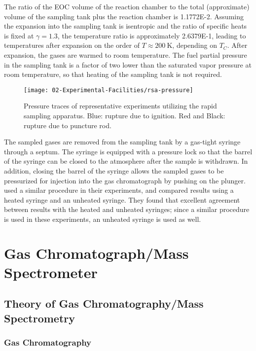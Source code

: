 \documentclass[../main.tex]{subfiles}
\begin{document}
The ratio of the EOC volume of the
reaction chamber to the total (approximate) volume of the sampling tank
plus the reaction chamber is \num{1.1772E-2}. Assuming the expansion
into the sampling tank is isentropic and the ratio of specific heats is
fixed at $\gamma=1.3$, the temperature ratio is approximately
\num{2.6379E-1}, leading to temperatures after expansion on the order of
$T\approx\SI{200}{\kelvin}$, depending on $T_C$. After expansion, the
gases are warmed to room temperature. The fuel partial pressure in the
sampling tank is a factor of two lower than the saturated vapor pressure
at room temperature, so that heating of the sampling tank is not required.

\begin{figure}
\texttt{[image: 02-Experimental-Facilities/rsa-pressure]}
\caption{Pressure traces of representative experiments utilizing the
rapid sampling apparatus. Blue: rupture due to ignition. Red and Black:
rupture due to puncture rod.}
\label{fig:rsa-pressure}
\end{figure}

The sampled gases are removed from the sampling tank by a gas-tight
syringe through a septum. The syringe is equipped with a pressure lock
so that the barrel of the syringe can be closed to the atmosphere after
the sample is withdrawn. In addition, closing the barrel of the syringe
allows the sampled gases to be pressurized for injection into the gas
chromatograph by pushing on the plunger. \textcite{He2007} used a similar
procedure in their experiments, and compared results using a heated
syringe and an unheated syringe. They found that excellent agreement
between results with the heated and unheated syringes; since a similar
procedure is used in these experiments, an unheated syringe is used as
well.

\section{Gas Chromatograph/Mass Spectrometer}
\label{sec:gcms}

\subsection{Theory of Gas Chromatography/Mass Spectrometry}
\label{sec:gcms-theory}

\subsubsection{Gas Chromatography}
\end{document}
